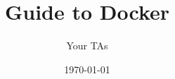 \documentclass{article}
\title{Guide to Docker}
\author{Your TAs}
\date{\today}
\begin{document}
\maketitle

\tableofcontents
\pagebreak



\end{document}
